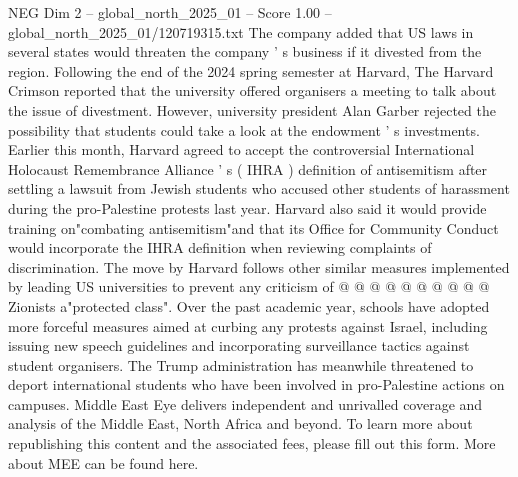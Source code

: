 \begin{textsample}{NEG Dim 2 – global\_north\_2025\_01 – Score 1.00 – global\_north\_2025\_01/120719315.txt}
The company added that US laws in several states would threaten the company ' s business if it divested from the region.
Following the end of the 2024 spring semester at Harvard, The Harvard Crimson reported that the university offered organisers a meeting to talk about the issue of divestment.
However, university president Alan Garber rejected the possibility that students could take a look at the endowment ' s investments.
Earlier this month, Harvard agreed to accept the controversial International Holocaust Remembrance Alliance ' s ( IHRA ) definition of antisemitism after settling a lawsuit from Jewish students who accused other students of harassment during the pro-Palestine protests last year.
Harvard also said it would provide training on"combating antisemitism"and that its Office for Community Conduct would incorporate the IHRA definition when reviewing complaints of discrimination.
The move by Harvard follows other similar measures implemented by leading US universities to prevent any criticism of @ @ @ @ @ @ @ @ @ @ Zionists a"protected class".
Over the past academic year, schools have adopted more forceful measures aimed at curbing any protests against Israel, including issuing new speech guidelines and incorporating surveillance tactics against student organisers.
The Trump administration has meanwhile threatened to deport international students who have been involved in pro-Palestine actions on campuses.
Middle East Eye delivers independent and unrivalled coverage and analysis of the Middle East, North Africa and beyond.
To learn more about republishing this content and the associated fees, please fill out this form.
More about MEE can be found here.

\end{textsample}
